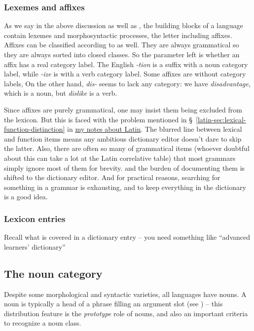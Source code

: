 \documentclass[UTF8, a4paper, oneside, scheme=plain]{ctexart}
\newcommand*{\citesec}[1]{\S~{#1}}
\newcommand*{\corpus}[1]{\emph{#1}}
\newcommand{\latin}{\href{../Latin/latin-notes.pdf}{my notes about Latin}}
\begin{document}
\subsubsection{Lexemes and affixes}

As we say in the above discussion as well as ,
the building blocks of a language contain lexemes and morphosyntactic processes,
the letter including affixes.
Affixes can be classified according to  as well.
They are always grammatical 
so they are always sorted into closed classes.
So the parameter left is whether an affix has a real category label.
The English \corpus{-tion} is a suffix with a noun category label,
while \corpus{-ize} is with a verb category label.
Some affixes are without category labels,
On the other hand, \corpus{dis-} seems to lack any category:
we have \corpus{disadvantage}, which is a noun,
but \corpus{dislike} is a verb.

Since affixes are purely grammatical,
one may insist them being excluded from the lexicon.
But this is faced with the problem mentioned 
in \citesec{\ref{latin-sec:lexical-function-distinction}} in \latin.
The blurred line between lexical and function items means 
any ambitious dictionary editor doesn't dare to skip the latter.
Also, there are often so many of grammatical items 
(whoever doubtful about this can take a lot at the Latin correlative table)
that most grammars simply ignore most of them for brevity.
and the burden of documenting them is shifted to the dictionary editor.
And for practical reasons,
searching for something in a grammar is exhausting,
and to keep everything in the dictionary is a good idea.

\subsubsection{Lexicon entries}

Recall what is covered in a dictionary entry
-- you need something like ``advanced learners' dictionary''

\subsection{The noun category}

Despite some morphological and syntactic varieties, 
all languages have nouns. 
A noun is typically a head of a phrase filling an argument slot (see )
-- this distribution feature is the \emph{prototype} role of nouns, 
and also an important criteria to recognize a noun class.
\end{document}
